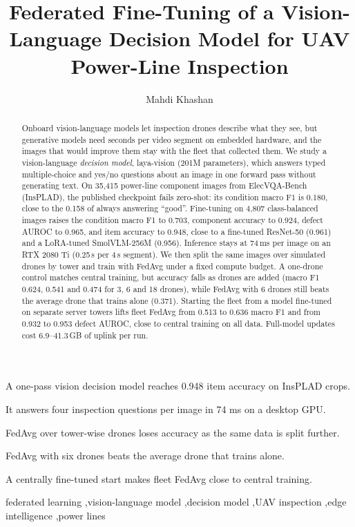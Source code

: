 \documentclass[preprint,12pt]{elsarticle}
\begin{document}
\begin{frontmatter}

\title{Federated Fine-Tuning of a Vision-Language Decision Model for UAV Power-Line Inspection}

\author{Mahdi Khashan}

\begin{abstract}
Onboard vision-language models let inspection drones describe what they see, but generative models need seconds per video segment on embedded hardware, and the images that would improve them stay with the fleet that collected them. We study a vision-language \emph{decision model}, laya-vision (201M parameters), which answers typed multiple-choice and yes/no questions about an image in one forward pass without generating text. On 35,415 power-line component images from ElecVQA-Bench (InsPLAD), the published checkpoint fails zero-shot: its condition macro F1 is 0.180, close to the 0.158 of always answering ``good''. Fine-tuning on 4,807 class-balanced images raises the condition macro F1 to 0.703, component accuracy to 0.924, defect AUROC to 0.965, and item accuracy to 0.948, close to a fine-tuned ResNet-50 (0.961) and a LoRA-tuned SmolVLM-256M (0.956). Inference stays at 74\,ms per image on an RTX 2080 Ti (0.25\,s per 4\,s segment). We then split the same images over simulated drones by tower and train with FedAvg under a fixed compute budget. A one-drone control matches central training, but accuracy falls as drones are added (macro F1 0.624, 0.541 and 0.474 for 3, 6 and 18 drones), while FedAvg with 6 drones still beats the average drone that trains alone (0.371). Starting the fleet from a model fine-tuned on separate server towers lifts fleet FedAvg from 0.513 to 0.636 macro F1 and from 0.932 to 0.953 defect AUROC, close to central training on all data. Full-model updates cost 6.9--41.3\,GB of uplink per run.
\end{abstract}

\begin{highlights}
\item A one-pass vision decision model reaches 0.948 item accuracy on InsPLAD crops.
\item It answers four inspection questions per image in 74 ms on a desktop GPU.
\item FedAvg over tower-wise drones loses accuracy as the same data is split further.
\item FedAvg with six drones beats the average drone that trains alone.
\item A centrally fine-tuned start makes fleet FedAvg close to central training.
\end{highlights}

\begin{keyword}
federated learning \sep vision-language model \sep decision model \sep UAV inspection \sep edge intelligence \sep power lines
\end{keyword}

\end{frontmatter}
\end{document}
